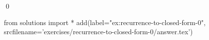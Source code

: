 \begin{ex}
  \label{ex:recurrence-to-closed-form-0}
  
  \qed
\end{ex}
\begin{python0}
from solutions import *
add(label="ex:recurrence-to-closed-form-0",
    srcfilename='exercises/recurrence-to-closed-form-0/answer.tex') 
\end{python0}                              

